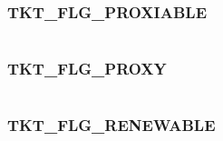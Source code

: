\documentclass[letterpaper,10pt,english]{sphinxmanual}
\begin{document}
\subsubsection{TKT\_FLG\_PROXIABLE}
\label{appdev/refs/macros/TKT_FLG_PROXIABLE:tkt-flg-proxiable}\label{appdev/refs/macros/TKT_FLG_PROXIABLE:tkt-flg-proxiable-data}\label{appdev/refs/macros/TKT_FLG_PROXIABLE::doc}

\begin{fulllineitems}
\label{appdev/refs/macros/TKT_FLG_PROXIABLE:TKT_FLG_PROXIABLE}
\end{fulllineitems}


\begin{tabulary}{\linewidth}{|L|L|}
\hline

 & 
\\\hline
\end{tabulary}



\subsubsection{TKT\_FLG\_PROXY}
\label{appdev/refs/macros/TKT_FLG_PROXY::doc}\label{appdev/refs/macros/TKT_FLG_PROXY:tkt-flg-proxy}\label{appdev/refs/macros/TKT_FLG_PROXY:tkt-flg-proxy-data}

\begin{fulllineitems}
\label{appdev/refs/macros/TKT_FLG_PROXY:TKT_FLG_PROXY}
\end{fulllineitems}


\begin{tabulary}{\linewidth}{|L|L|}
\hline

 & 
\\\hline
\end{tabulary}



\subsubsection{TKT\_FLG\_RENEWABLE}
\label{appdev/refs/macros/TKT_FLG_RENEWABLE::doc}\label{appdev/refs/macros/TKT_FLG_RENEWABLE:tkt-flg-renewable}\label{appdev/refs/macros/TKT_FLG_RENEWABLE:tkt-flg-renewable-data}
\end{document}
